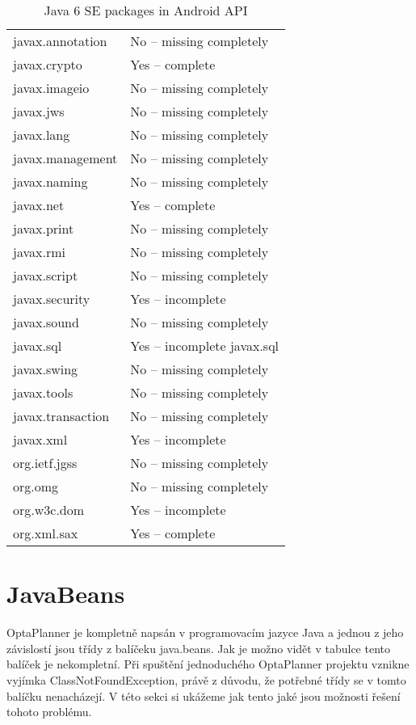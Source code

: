 \begin {table}[h!]
\begin{tabular}{|l|l|}
javax.annotation	    & No -- missing completely    \\
javax.crypto	        & Yes -- complete              \\
javax.imageio	        & No -- missing completely    \\
javax.jws	            & No -- missing completely    \\
javax.lang	            & No -- missing completely    \\
javax.management        & No -- missing completely    \\
javax.naming	        & No -- missing completely    \\
javax.net	            & Yes -- complete              \\
javax.print		        & No -- missing completely    \\
javax.rmi		        & No -- missing completely    \\
javax.script	        & No -- missing completely    \\
javax.security          & Yes -- incomplete            \\
javax.sound             & No -- missing completely    \\
javax.sql	            & Yes -- incomplete javax.sql  \\
javax.swing	            & No -- missing completely    \\
javax.tools	            & No -- missing completely    \\
javax.transaction	    & No -- missing completely    \\
javax.xml	            & Yes -- incomplete            \\
org.ietf.jgss	        & No -- missing completely    \\
org.omg                 & No -- missing completely    \\
org.w3c.dom             & Yes -- incomplete            \\
org.xml.sax	            & Yes -- complete              \\
\hline
\end{tabular}
\centering
\caption{Java 6 SE packages in Android API}
\end{table}

\section{JavaBeans}
OptaPlanner je kompletně napsán v programovacím jazyce Java a jednou z jeho závislostí jsou třídy z balíčeku java.beans. Jak je možno vidět v tabulce tento balíček je nekompletní. Při spuštění jednoduchého OptaPlanner projektu vznikne vyjímka ClassNotFoundException, právě z důvodu, že potřebné třídy se v tomto balíčku nenacházejí.   V této sekci si ukážeme jak tento jaké jsou možnosti řešení tohoto problému.

